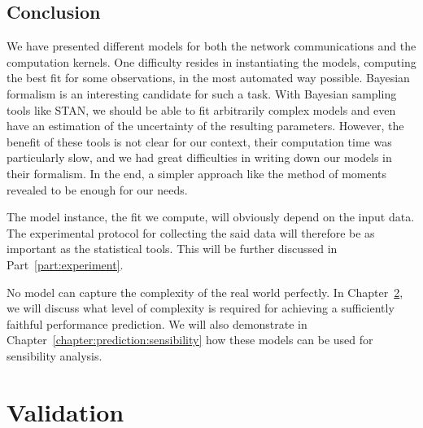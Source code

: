     \section{Conclusion}%
        We have presented different models for both the network communications and the computation kernels. One
        difficulty resides in instantiating the models, \ie computing the best fit for some observations, in the most
        automated way possible. Bayesian formalism is an interesting candidate for such a task. With Bayesian sampling
        tools like STAN, we should be able to fit arbitrarily complex models and even have an estimation of the
        uncertainty of the resulting parameters. However, the benefit of these tools is not clear for our context, their
        computation time was particularly slow, and we had great difficulties in writing down our models in their
        formalism. In the end, a simpler approach like the method of moments revealed to be enough for our needs.

        The model instance, \ie the fit we compute, will obviously depend on the input data. The experimental protocol
        for collecting the said data will therefore be as important as the statistical tools. This will be further
        discussed in Part~\ref{part:experiment}.

        No model can capture the complexity of the real world perfectly. In Chapter~\ref{chapter:prediction:validation},
        we will discuss what level of complexity is required for achieving a sufficiently faithful performance
        prediction. We will also demonstrate in Chapter~\ref{chapter:prediction:sensibility} how these models can be
        used for sensibility analysis.

\chapter{Validation}%
\label{chapter:prediction:validation}

